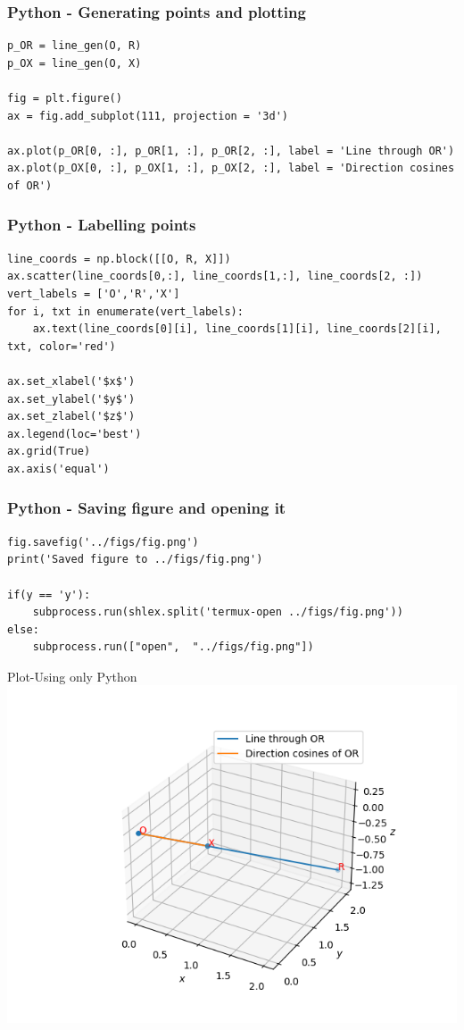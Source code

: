 \documentclass{beamer}
\begin{document}
\begin{frame}[fragile]
    \frametitle{Python - Generating points and plotting}
    \begin{lstlisting}
p_OR = line_gen(O, R)
p_OX = line_gen(O, X)

fig = plt.figure()
ax = fig.add_subplot(111, projection = '3d')

ax.plot(p_OR[0, :], p_OR[1, :], p_OR[2, :], label = 'Line through OR')
ax.plot(p_OX[0, :], p_OX[1, :], p_OX[2, :], label = 'Direction cosines of OR')
\end{lstlisting}
\end{frame}

\begin{frame}[fragile]
    \frametitle{Python - Labelling points}
    \begin{lstlisting}
line_coords = np.block([[O, R, X]])
ax.scatter(line_coords[0,:], line_coords[1,:], line_coords[2, :])
vert_labels = ['O','R','X']
for i, txt in enumerate(vert_labels):
    ax.text(line_coords[0][i], line_coords[1][i], line_coords[2][i], txt, color='red')

ax.set_xlabel('$x$')
ax.set_ylabel('$y$')
ax.set_zlabel('$z$')
ax.legend(loc='best')
ax.grid(True) 
ax.axis('equal')
    \end{lstlisting}
\end{frame}

\begin{frame}[fragile]
    \frametitle{Python - Saving figure and opening it}
    \begin{lstlisting}
fig.savefig('../figs/fig.png')
print('Saved figure to ../figs/fig.png')

if(y == 'y'):
    subprocess.run(shlex.split('termux-open ../figs/fig.png'))
else:
    subprocess.run(["open",  "../figs/fig.png"])
    \end{lstlisting}
\end{frame}


\begin{frame}{Plot-Using only Python}
    \centering
    \includegraphics[width=\columnwidth, height=0.8\textheight, keepaspectratio]{../figs/fig.png}     
\end{frame}
\end{document}
